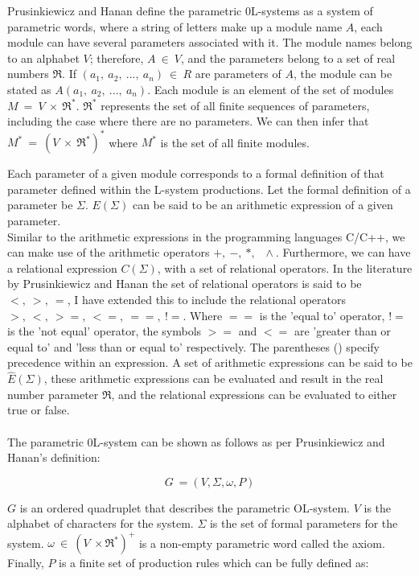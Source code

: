 Prusinkiewicz and Hanan define the parametric 0L-systems as a system of parametric words, where a string of letters make up a module name $A$, each module can have several parameters associated with it. The module names belong to an alphabet $V$; therefore, $A~ \in~ V$, and the parameters belong to a set of real numbers $\Re$. If $(a_1,~ a_2,~ ...,~ a_n)~ \in~ R$ are parameters of $A$, the module can be stated as $A(a_1,~ a_2,~ ...,~ a_n)$. Each module is an element of the set of modules $M~ =~ V~ \times~ \Re^*$. $\Re^*$ represents the set of all finite sequences of parameters, including the case where there are no parameters. We can then infer that $M^*~ =~ (V~ \times~ \Re^*)^*$ where $M^*$ is the set of all finite modules. 

Each parameter of a given module corresponds to a formal definition of that parameter defined within the L-system productions. Let the formal definition of a parameter be $\Sigma$. $ E(\Sigma) $ can be said to be an arithmetic expression of a given parameter.\\ Similar to the arithmetic expressions in the programming languages C/C++, we can make use of the arithmetic operators $ +,~ -,~ *,~ \,~ \wedge{}$. Furthermore, we can have a relational expression $C(\Sigma)$, with a set of relational operators. In the literature by Prusinkiewicz and Hanan the set of relational operators is said to be $<,~ >,~ =$, I have extended this to include the relational operators $>,~ <,~ >=,~ <=,~ ==,~ !=$. Where $==$ is the 'equal to' operator, $!=$ is the 'not equal' operator, the symbols $>=$ and $<=$ are 'greater than or equal to' and 'less than or equal to' respectively. The parentheses () specify precedence within an expression. A set of arithmetic expressions can be said to be $\hat{E} (\Sigma)$,  these arithmetic expressions can be evaluated and result in the real number parameter $\Re $, and the relational expressions can be evaluated to either true or false. \\
\\
The parametric 0L-system can be shown as follows as per Prusinkiewicz and Hanan's definition:

\begin{equation}
G~ = (V, \Sigma, \omega, P)
\end{equation}
\vspace{5mm}

\noindent
$G$ is an ordered quadruplet that describes the parametric OL-system. $V$ is the alphabet of characters for the system. $\Sigma$ is the set of formal parameters for the system. $\omega~ \in~ (V~ \times \Re^*)^+$ is a non-empty parametric word called the axiom. Finally, $P$ is a finite set of production rules which can be fully defined as:

